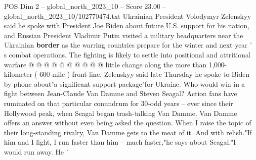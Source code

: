 \begin{textsample}{POS Dim 2 – global\_north\_2023\_10 – Score 23.00 – global\_north\_2023\_10/102770474.txt}
Ukrainian President Volodymyr Zelenskyy said he spoke with President Joe Biden about future U.S. support for his nation, and Russian President Vladimir Putin visited a military headquarters near the Ukrainian \textbf{border} as the warring countries prepare for the winter and next year ' s combat operations.
The fighting is likely to settle into positional and attritional warfare @ @ @ @ @ @ @ @ @ @ little change along the more than 1,000-kilometer ( 600-mile ) front line.
Zelenskyy said late Thursday he spoke to Biden by phone about"a significant support package"for Ukraine.
Who would win in a fight between Jean-Claude Van Damme and Steven Seagal?
Action fans have ruminated on that particular conundrum for 30-odd years -- ever since their Hollywood peak, when Seagal began trash-talking Van Damme.
Van Damme offers an answer without even being asked the question.
When I raise the topic of their long-standing rivalry, Van Damme gets to the meat of it.
And with relish."If him and I fight, I run faster than him -- much faster,"he says about Seagal."I would run away.
He '

\end{textsample}
